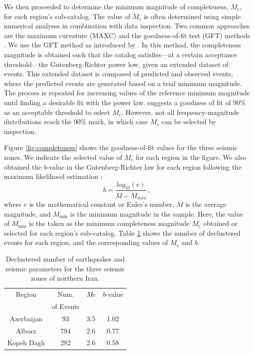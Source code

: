 We then proceeded to determine the minimum magnitude of completeness, $M_c$, for each region's sub-catalog. The value of $M_c$ is often determined using simple numerical analyses in combination with data inspection. Two common approaches are the maximum curvature (MAXC) and the goodness-of-fit test (GFT) methods \citep{Wiemer2001}. We use the GFT method as introduced by \citet{Wiemer2000}. In this method, the completeness magnitude is obtained such that the catalog satisfies---at a certain acceptance threshold---the Gutenberg-Richter power low, given an extended dataset of events. This extended dataset is composed of predicted and observed events, where the predicted events are generated based on a trial minimum magnitude. The process is repeated for increasing values of the reference minimum magnitude until finding a desirable fit with the power law. \citet{Wiemer2000} suggests a goodness of fit of 90\% as an acceptable threshold to select $M_c$. However, not all frequency-magnitude distributions reach the 90\% mark, in which case $M_c$ can be selected by inspection. 

Figure \ref{fig:completeness} shows the goodness-of-fit values for the three seismic zones. We indicate the selected value of $M_c$ for each region in the figure. We also obtained the $b$-value in the Gutenberg-Richter law for each region following the maximum likelihood estimation \citep{Aki1965}:
% 
\begin{equation}
	b = \frac{log_{10}(e)}{\overline{M} - M_{min}} \, ,
\end{equation}
% 
where $e$ is the mathematical constant or Euler's number, $\overline{M}$ is the average magnitude, and $M_{\min}$ is the minimum magnitude in the sample. Here, the value of $M_{\min}$ is the taken as the minimum completeness magnitude $M_c$ obtained or selected for each region's sub-catalog. Table \ref{tab:seismicity} shows the number of declustered events for each region, and the corresponding values of $M_c$ and $b$.

\begin{table}[h]
	\selectfont
	\caption{Declustered number of earthquakes and seismic parameters for the three seismic zones of northern Iran.}
	\centering\small
	\begin{tabular}{|cccc|}
		\hline
		Region      & Num.      & \textit{M}c & \textit{b}-value \\ 
		            & of Events &             &                  \\
		\hline
		Azerbaijan  &        93 &         3.5 &             1.02 \\
		Alborz      &       794 &         2.6 &             0.77 \\
		Kopeh Dagh  &       282 &         2.6 &             0.58 \\
		\hline
	\end{tabular}
	\label{tab:seismicity}
\end{table}

